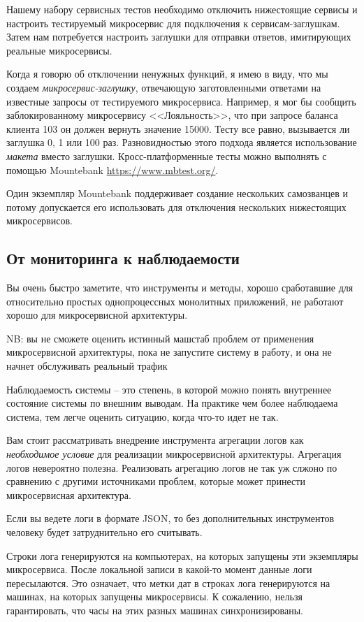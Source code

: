 \documentclass[%
	11pt,
	a4paper,
	utf8,
		]{article}
\begin{document}
Нашему набору сервисных тестов необходимо отключить нижестоящие сервисы и настроить тестируемый микросервис для подключения к сервисам-заглушкам. Затем нам потребуется настроить заглушки для отправки ответов, имитирующих реальные микросервисы.

Когда я говорю об отключении ненужных функций, я имею в виду, что мы создаем \emph{микросервис-заглушку}, отвечающую заготовленными ответами на известные запросы от тестируемого микросервиса. Например, я мог бы сообщить заблокированному микросервису <<Лояльность>>, что при запросе баланса клиента 103 он должен вернуть значение 15000. Тесту все равно, вызывается ли заглушка 0, 1 или 100 раз. Разновидностью этого подхода является использование \emph{макета} вместо заглушки. Кросс-платформенные тесты можно выполнять с помощью Mountebank \url{https://www.mbtest.org/}. 

Один экземпляр Mountebank поддерживает создание нескольких самозванцев и потому допускается его использовать для отключения нескольких нижестоящих микросервисов.

\subsection{От мониторинга к наблюдаемости}

Вы очень быстро заметите, что инструменты и методы, хорошо сработавшие для относительно простых однопроцессных монолитных приложений, не работают хорошо для микросервисной архитектуры.

{\color{red}NB: вы не сможете оценить истинный машстаб проблем от применения микросервисной архитектуры, пока не запустите систему в работу, и она не начнет обслуживать реальный трафик}

Наблюдаемость системы -- это степень, в которой можно понять внутреннее состояние системы по внешним выводам. На практике чем более наблюдаема система, тем легче оценить ситуацию, когда что-то идет не так. 

Вам стоит рассматривать внедрение инструмента агрегации логов как \emph{необходимое условие} для реализации микросервисной архитектуры. Агрегация логов невероятно полезна. Реализовать агрегацию логов не так уж слжоно по сравнению с другими источниками проблем, которые может принести микросервисная архитектура.

Если вы ведете логи в формате JSON, то без дополнительных инструментов человеку будет затруднительно его считывать.

Строки лога генерируются на компьютерах, на которых запущены эти экземпляры микросервиса. После локальной записи в какой-то момент данные логи пересылаются. Это означает, что метки дат в строках лога генерируются на машинах, на которых запущены микросервисы. К сожалению, нельзя гарантировать, что часы на этих разных машинах синхронизированы. 
\end{document}
